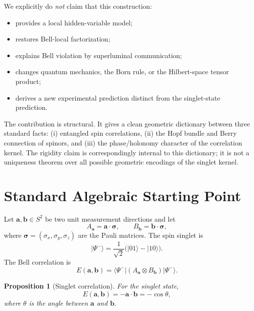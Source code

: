 \documentclass[
  aps,
  pra,
  reprint,
  superscriptaddress,
  nofootinbib,
  longbibliography,
  floatfix,
  amsmath,
  amssymb
]{revtex4-2}
\theoremstyle{plain}
\newtheorem{proposition}[theorem]{Proposition}
\theoremstyle{definition}
\theoremstyle{remark}
\newcommand{\ket}[1]{\lvert #1\rangle}
\newcommand{\bra}[1]{\langle #1\rvert}
\newcommand{\Pauli}{\boldsymbol{\sigma}}
\begin{document}
We explicitly do \emph{not} claim that this construction:
\begin{itemize}
\item provides a local hidden-variable model;
\item restores Bell-local factorization;
\item explains Bell violation by superluminal communication;
\item changes quantum mechanics, the Born rule, or the Hilbert-space tensor product;
\item derives a new experimental prediction distinct from the singlet-state prediction.
\end{itemize}

The contribution is structural.  It gives a clean geometric dictionary between three standard facts: (i) entangled spin correlations, (ii) the Hopf bundle and Berry connection of spinors, and (iii) the phase/holonomy character of the correlation kernel.  The rigidity claim is correspondingly internal to this dictionary; it is not a uniqueness theorem over all possible geometric encodings of the singlet kernel.

\section{Standard Algebraic Starting Point}
\label{sec:standard}

Let \(\bm a,\bm b\in S^2\) be two unit measurement directions and let
\begin{equation}
A_{\bm a}=\bm a\cdot\Pauli,\qquad B_{\bm b}=\bm b\cdot\Pauli,
\end{equation}
where \(\Pauli=(\sigma_x,\sigma_y,\sigma_z)\) are the Pauli matrices.  The spin singlet is
\begin{equation}
\ket{\Psi^-}=\frac{1}{\sqrt2}\bigl(\ket{01}-\ket{10}\bigr).
\end{equation}
The Bell correlation is
\begin{equation}
E(\bm a,\bm b)=
\bra{\Psi^-}(A_{\bm a}\otimes B_{\bm b})\ket{\Psi^-}.
\label{eq:Edef}
\end{equation}

\begin{proposition}[Singlet correlation]
For the singlet state,
\begin{equation}
E(\bm a,\bm b)=-\bm a\cdot\bm b=-\cos\theta,
\label{eq:singletcorr}
\end{equation}
where \(\theta\) is the angle between \(\bm a\) and \(\bm b\).
\end{proposition}
\end{document}

